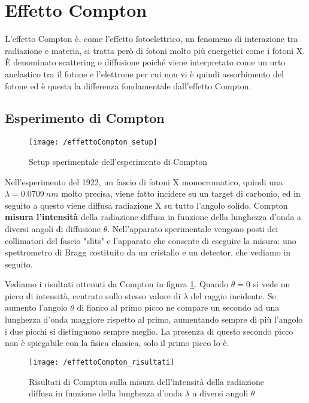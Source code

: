 
\section{Effetto Compton}

L'effetto Compton è, come l'effetto fotoelettrico, un fenomeno di interazione tra radiazione e materia, si tratta però di fotoni molto più energetici come i fotoni X.
È denominato scattering o diffusione poiché viene interpretato come un urto anelastico tra il fotone e l'elettrone per cui non vi è quindi assorbimento del fotone ed è questa la differenza fondamentale dall'effetto Compton.

\subsection{Esperimento di Compton}
\begin{figure}[h]
\centering
\texttt{[image: /effettoCompton\_setup]}
\caption{Setup sperimentale dell'esperimento di Compton}
\end{figure}

Nell'esperimento del 1922, un fascio di fotoni X monocromatico, quindi una $\lambda = \SI{0.0709}{nm}$ molto precisa, viene fatto incidere su un target di carbonio, ed in seguito a questo viene diffusa radiazione X su tutto l'angolo solido.
Compton \textbf{misura l'intensità} della radiazione diffusa in funzione della lunghezza d'onda a diversi angoli di diffusione $\theta$.
Nell'apparato sperimentale vengono posti dei collimatori del fascio "slits" e l'apparato che consente di eseguire la misura: uno spettrometro di Bragg costituito da un cristallo e un detector, che vediamo in seguito.

Vediamo i risultati ottenuti da Compton in figura \ref{compton_results}.
Quando $\theta = 0$ si vede un picco di intensità, centrato sullo stesso valore di $\lambda$ del raggio incidente.
Se aumento l'angolo $\theta$ di fianco al primo picco ne compare un secondo ad una lunghezza d'onda maggiore rispetto al primo,
aumentando sempre di più l'angolo i due picchi si distinguono sempre meglio.
La presenza di questo secondo picco non è spiegabile con la fisica classica, solo il primo picco lo è.

\begin{figure}[h]
\centering
\texttt{[image: /effettoCompton\_risultati]}
\caption{Risultati di Compton sulla misura dell'intensità della radiazione diffusa in funzione della lunghezza d'onda $\lambda$ a diversi angoli $\theta$}
\label{compton_results}
\end{figure}


